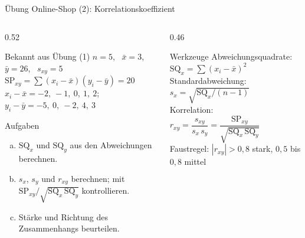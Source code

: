 \documentclass[aspectratio=169,11pt]{beamer}
\newcommand{\mindestzeilenabstand}{%
  \setlength{\lineskiplimit}{2pt}\setlength{\lineskip}{2pt}%
  \setlength{\normallineskiplimit}{2pt}\setlength{\normallineskip}{2pt}}
\newcommand{\SQx}{\text{SQ}_x}
\newcommand{\SQy}{\text{SQ}_y}
\newcommand{\SPxy}{\text{SP}_{xy}}
\begin{document}
\begin{frame}{Übung Online-Shop (2): Korrelationskoeffizient}
  \begin{columns}[T]
    \begin{column}{0.52\textwidth}
      \small
      \begin{block}{Bekannt aus Übung (1)}
        $n = 5$, \ $\bar{x} = 3$, \ $\bar{y} = 26$, \ $s_{xy} = 5$\\[2pt]
        $\SPxy = \sum (x_i-\bar{x})(y_i-\bar{y}) = 20$\\[2pt]
        $x_i - \bar{x} = -2,\ -1,\ 0,\ 1,\ 2$; \ $y_i - \bar{y} = -5,\ 0,\ -2,\ 4,\ 3$
      \end{block}
      \begin{exampleblock}{Aufgaben}
        \begin{enumerate}[a)]
          \item $\SQx$ und $\SQy$ aus den Abweichungen
                berechnen.
          \item $s_x$, $s_y$ und $r_{xy}$ berechnen; mit
                $\SPxy / \sqrt{\SQx\,\SQy}$ kontrollieren.
          \item Stärke und Richtung des Zusammenhangs beurteilen.
        \end{enumerate}
      \end{exampleblock}
    \end{column}
    \begin{column}{0.46\textwidth}
      \small\mindestzeilenabstand
      \begin{block}{Werkzeuge}
        Abweichungsquadrate: $\SQx = \sum (x_i - \bar{x})^{2}$\\[3pt]
        Standardabweichung: $s_x = \sqrt{\SQx / (n-1)}$\\[3pt]
        Korrelation: $r_{xy} = \dfrac{s_{xy}}{s_x\,s_y} = \dfrac{\SPxy}{\sqrt{\SQx\,\SQy}}$\\[3pt]
        Faustregel: $|r_{xy}| > 0{,}8$ stark, $0{,}5$ bis $0{,}8$ mittel
      \end{block}
    \end{column}
  \end{columns}
\end{frame}
\end{document}
